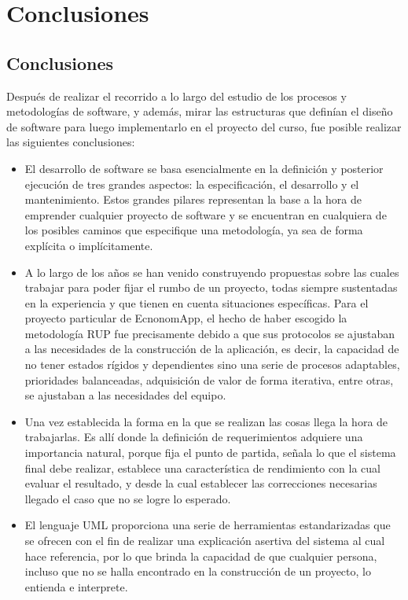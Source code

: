 \chapter{Conclusiones}

\section{Conclusiones}
Después de realizar el recorrido a lo largo del estudio de los procesos y metodologías de software, y además, mirar las estructuras que definían el diseño de software para luego implementarlo en el proyecto del curso, fue posible realizar las siguientes conclusiones:
\begin{itemize}
	\item El desarrollo de software se basa esencialmente en la definición y posterior ejecución de tres grandes aspectos: la especificación, el desarrollo y el mantenimiento. Estos grandes pilares representan la base a la hora de emprender cualquier proyecto de software y se encuentran en cualquiera de los posibles caminos que especifique una metodología, ya sea de forma explícita o implícitamente.  
	
	\item A lo largo de los años se han venido construyendo propuestas sobre las cuales trabajar para poder fijar el rumbo de un proyecto, todas siempre sustentadas en la experiencia y que tienen en cuenta situaciones específicas. Para el proyecto particular de EcnonomApp, el hecho de haber escogido la metodología RUP fue precisamente debido a que sus protocolos se ajustaban a las necesidades de la construcción de la aplicación, es decir, la capacidad de no tener estados rígidos y dependientes sino una serie de procesos adaptables, prioridades balanceadas, adquisición de valor de forma iterativa, entre otras, se ajustaban a las necesidades del equipo.
	
	\item Una vez establecida la forma en la que se realizan las cosas llega la hora de trabajarlas. Es allí donde la definición de requerimientos adquiere una importancia natural, porque fija el punto de partida, señala lo que el sistema final debe realizar, establece una característica de rendimiento con la cual evaluar el resultado, y desde la cual establecer las correcciones necesarias llegado el caso que no se logre lo esperado.
	
	\item El lenguaje UML proporciona una serie de herramientas estandarizadas que se ofrecen con el fin de realizar una explicación asertiva del sistema al cual hace referencia, por lo que brinda la capacidad de que cualquier persona, incluso que no se halla encontrado en la construcción de un proyecto, lo entienda e interprete.
	

\end{itemize}
